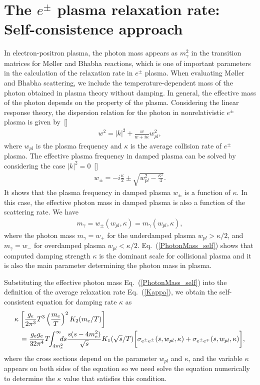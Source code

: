 \section{The $e^\pm$ plasma relaxation rate: Self-consistence approach}
In electron-positron plasma, the photon mass appears as $m_\gamma^2$ in the transition matrices for M{\o}ller and Bhabha reactions, which is one of important parameters in the calculation of the relaxation rate in $e^\pm$ plasma. When evaluating M{\o}ller and Bhabha scattering, we include the temperature-dependent mass of the photon obtained in plasma theory without damping. In general, the effective mass of the photon depends on the property of the plasma. Considering the linear response theory, the dispersion relation for the photon in nonrelativistic $e^\pm$ plasma is given by~[\cite{Formanek:2021blc}]
\begin{align}\label{dispersion_damping}
w^2=|k|^2+\frac{w}{w+i\kappa}w_{pl}^2,
\end{align}
where $w_{pl}$ is the plasma frequency and $\kappa$ is the average collision rate of $e^\pm$ plasma. The effective plasma frequency in damped plasma can be solved by considering the case $|k|^2=0$~[\cite{Formanek:2021blc}]
\begin{align}\label{plasmafrequency_damped}
w_{\pm}=-i\frac{\kappa}{2}\pm\sqrt{w^2_{pl}-\frac{\kappa^2}{4}}.
\end{align}
It shows that the plasma frequency in damped plasma $w_\pm$ is a function of $\kappa.$  In this case, the effective photon mass in damped plasma is also a function of the scattering rate. We have
\begin{align}\label{PhotonMass_self}
m_\gamma=w_\pm(w_{pl},\kappa)=m_\gamma(w_{pl},\kappa),
\end{align}
where the photon mass $m_\gamma=w_+$ for the underdamped plasma $w_{pl}>\kappa/2$, and $m_\gamma=w_-$ for overdamped plasma $w_{pl}<\kappa/2$. Eq.~(\ref{PhotonMass_self}) shows that computed damping strength $\kappa$ is the dominant scale for collisional plasma and it is also the main parameter determining the photon mass in plasma. 

Substituting the effective photon mass Eq.~(\ref{PhotonMass_self}) into the definition of the average relaxation rate Eq.~(\ref{Kappa}), we obtain the self-consistent equation for damping rate $\kappa$ as 
\begin{align}\label{RealaxtionSelf}
\kappa\,&\left[\frac{g_e}{2\pi^3}T^3\left(\frac{m_e}{T}\right)^2K_2(m_e/T)\right]\notag\\&=\frac{g_eg_e}{32\pi^4}T\!\!\int_{4m_e^2}^\infty\!\!\!\!ds\frac{s(s-4m^2_e)}{\sqrt{s}}K_1(\sqrt{s}/T)
\bigg[\sigma_{e^\pm e^\pm}(s,w_{pl},\kappa)+\sigma_{e^\pm e^\mp}(s,w_{pl},\kappa)\bigg],
\end{align}
where the cross sections depend on the parameter $w_{pl}$ and $\kappa$, and the variable $\kappa$ appears on both sides of the equation so we need solve the equation numerically to determine the $\kappa$ value that satisfies this condition.

